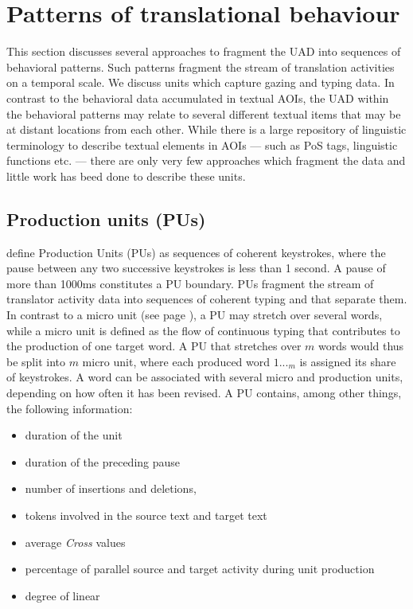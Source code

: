 \documentclass[output=paper]{LSP/langsci}
\begin{document}
\section{Patterns of translational behaviour}
\label{carl-schaeffer:sec:3}

This section discusses several approaches to fragment the UAD into sequences of behavioral patterns. Such patterns fragment the stream of translation activities on a temporal scale. We discuss units which capture gazing and typing data. In contrast to the behavioral data accumulated in textual AOIs, the UAD within the behavioral patterns may relate to several different textual items that may be at distant locations from each other. While there is a large repository of linguistic terminology to describe textual elements in AOIs --- such as PoS tags, linguistic functions etc. --- there are only very few approaches which fragment the  data and little work has beed done to describe these units.


\subsection{Production units (PUs)}
\label{carl-schaeffer:sec:3.1}

\citet{Carl2016CRITT,Carl2011Gazing} define Production Units (PUs) as sequences of coherent keystrokes, where the pause between any two successive keystrokes is less than 1 second. A pause of more than 1000ms constitutes a PU boundary. PUs fragment the stream of translator activity data into sequences of coherent typing and  that separate them. In contrast to a micro unit (see page \pageref{carl-schaeffer:sec:4.4}), a PU may stretch over several words, while a micro unit is defined as the flow of continuous typing that contributes to the production of one target word. A PU that stretches over $m$ words would thus be split into $m$ micro unit, where each produced word $1..._m$ is assigned its share of keystrokes. A word can be associated with several micro and production units, depending on how often it has been revised. A PU contains, among other things, the following information: 

\begin{itemize}
\item duration of the unit
\item duration of the preceding pause
\item number of insertions and deletions,
\item tokens involved in the source text and target text
\item average \textit{Cross} values
\item percentage of parallel source and target  activity during unit production
\item degree of linear 
\end{itemize}
\end{document}
